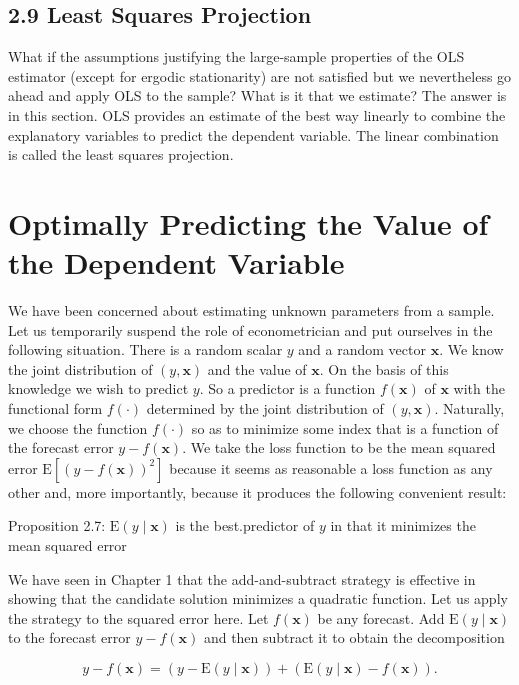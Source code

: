 \documentclass[10pt]{article}
\begin{document}
\subsection*{2.9 Least Squares Projection}
What if the assumptions justifying the large-sample properties of the OLS estimator (except for ergodic stationarity) are not satisfied but we nevertheless go ahead and apply OLS to the sample? What is it that we estimate? The answer is in this section. OLS provides an estimate of the best way linearly to combine the explanatory variables to predict the dependent variable. The linear combination is called the least squares projection.

\section*{Optimally Predicting the Value of the Dependent Variable}
We have been concerned about estimating unknown parameters from a sample. Let us temporarily suspend the role of econometrician and put ourselves in the following situation. There is a random scalar $y$ and a random vector $\mathbf{x}$. We know the joint distribution of $(y, \mathbf{x})$ and the value of $\mathbf{x}$. On the basis of this knowledge we wish to predict $y$. So a predictor is a function $f(\mathbf{x})$ of $\mathbf{x}$ with the functional form $f(\cdot)$ determined by the joint distribution of $(y, \mathbf{x})$. Naturally, we choose the function $f(\cdot)$ so as to minimize some index that is a function of the forecast error $y-f(\mathbf{x})$. We take the loss function to be the mean squared error $\mathrm{E}\left[(y-f(\mathbf{x}))^{2}\right]$ because it seems as reasonable a loss function as any other and, more importantly, because it produces the following convenient result:

Proposition 2.7: $\mathrm{E}(y \mid \mathbf{x})$ is the best.predictor of $y$ in that it minimizes the mean squared error

We have seen in Chapter 1 that the add-and-subtract strategy is effective in showing that the candidate solution minimizes a quadratic function. Let us apply the strategy to the squared error here. Let $f(\mathbf{x})$ be any forecast. Add $\mathrm{E}(y \mid \mathbf{x})$ to the forecast error $y-f(\mathbf{x})$ and then subtract it to obtain the decomposition


\begin{equation*}
y-f(\mathbf{x})=(y-\mathrm{E}(y \mid \mathbf{x}))+(\mathrm{E}(y \mid \mathbf{x})-f(\mathbf{x})) . \tag{2.9.1}
\end{equation*}
\end{document}
